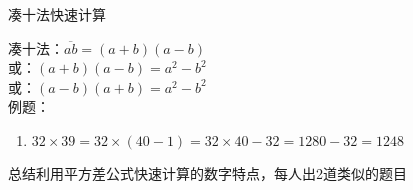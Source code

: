 \documentclass[aspectratio=169]{ctexbeamer} %
\date{\today}
\begin{document}
\begin{frame}[t]{凑十法快速计算}
\begin{spacing}{1.2}
\normalsize
凑十法：$\overline{ab} = (a+b)(a-b)$ \\
或：$(a+b)(a-b)=a^2 - b^2$ \\
或：$(a-b)(a+b)=a^2 - b^2$ \\
例题：
\begin{enumerate}[label={\arabic*.}]
\item $32 \times 39 = 32 \times (40-1)=32 \times 40-32=1280-32=1248$

\end{enumerate}
\alert{总结利用平方差公式快速计算的数字特点，每人出2道类似的题目}
\end{spacing}
\end{frame}
\end{document}
